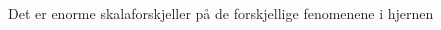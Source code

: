\documentclass[presentation]{beamer}
\begin{document}
\begin{frame}{Det er enorme skalaforskjeller på de forskjellige fenomenene i hjernen}
    \begin{columns}
    \begin{column}{0.5\textwidth}
        \begin{center}
        \begin{figure}
     \end{figure}
    \end{center}
    \end{column}
    \begin{column}{0.5\textwidth}  %
        \begin{center}

\end{center}
\end{column}
\end{columns}
\end{frame}
\end{document}
